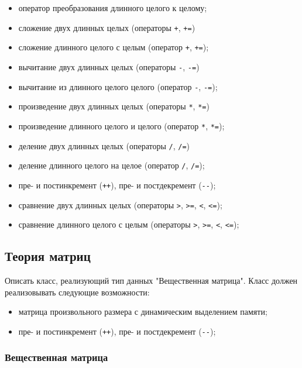 \documentclass[a4paper,12pt]{article}
\begin{document}
\begin{itemize}
\item оператор преобразования длинного целого к целому;
\item сложение двух длинных целых (операторы \lstinline|+|,
  \lstinline|+=|)
\item сложение длинного целого с целым (оператор \lstinline|+|,
  \lstinline|+=|);
\item вычитание двух длинных целых (операторы \lstinline|-|,
  \lstinline|-=|)
\item вычитание из длинного целого целого (оператор \lstinline|-|,
  \lstinline|-=|);
\item произведение двух длинных целых (операторы \lstinline|*|,
  \lstinline|*=|)
\item произведение длинного целого и целого (оператор \lstinline|*|,
  \lstinline|*=|);
\item деление двух длинных целых (операторы \lstinline|/|,
  \lstinline|/=|)
\item деление длинного целого на целое (оператор \lstinline|/|,
  \lstinline|/=|);
\item пре- и постинкремент (\lstinline|++|), пре- и постдекремент
  (\lstinline|--|);
\item сравнение двух длинных целых (операторы \lstinline|>|,
  \lstinline|>=|, \lstinline|<|, \lstinline|<=|);
\item сравнение длинного целого с целым (операторы \lstinline|>|,
  \lstinline|>=|, \lstinline|<|, \lstinline|<=|);
\end{itemize}

\subsection{Теория матриц}

Описать класс, реализующий тип данных "Вещественная матрица".  Класс
должен реализовывать следующие возможности:

\begin{itemize}
\item матрица произвольного размера с динамическим выделением памяти;
\item пре- и постинкремент (\lstinline|++|), пре- и постдекремент
  (\lstinline|--|);
\end{itemize}

\subsubsection{Вещественная матрица}
\end{document}
